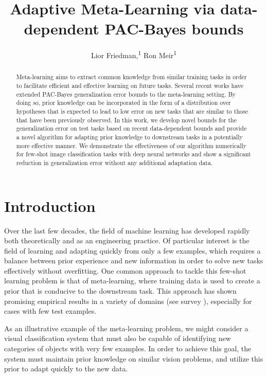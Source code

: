 \documentclass[letterpaper]{article} %
\title{Adaptive Meta-Learning via data-dependent PAC-Bayes bounds}
\author{
	Lior Friedman,\textsuperscript{\rm 1}
	Ron Meir\textsuperscript{\rm 1}
}
\theoremstyle{definition}
\begin{document}
	
\maketitle

\begin{abstract}
	Meta-learning aims to extract common knowledge from similar training tasks in order to facilitate efficient and effective learning on future tasks. Several recent works have extended PAC-Bayes generalization error bounds to the meta-learning setting.
	By doing so, prior knowledge can be incorporated in the form of a distribution over hypotheses that is expected to lead to low error on new tasks that are similar to those that have been previously observed.
	In this work, we develop novel bounds for the generalization error on test tasks based on recent data-dependent bounds and provide a novel algorithm for adapting prior knowledge to downstream tasks in a potentially more effective manner.
	We demonstrate the effectiveness of our algorithm numerically for few-shot image classification tasks with deep neural networks and show a significant reduction in generalization error without any additional adaptation data.
\end{abstract}

\section{Introduction}

Over the last few decades, the field of machine learning has developed rapidly both theoretically and as an engineering practice. Of particular interest is the field of learning and adapting quickly from only a few examples, which requires a balance between prior experience and new information in order to solve new tasks effectively without overfitting.
One common approach to tackle this few-shot learning problem is that of meta-learning, where training data is used to create a prior that is conducive to the downstream task. This approach has shown promising empirical results in a variety of domains (see survey \citep{Hospedales2021}), especially for cases with few test examples.

As an illustrative example of the meta-learning problem, we might consider a visual classification system that must also be capable of identifying new categories of objects with very few examples. In order to achieve this goal, the system must maintain prior knowledge on similar vision problems, and utilize this prior to adapt quickly to the new data.
\end{document}
